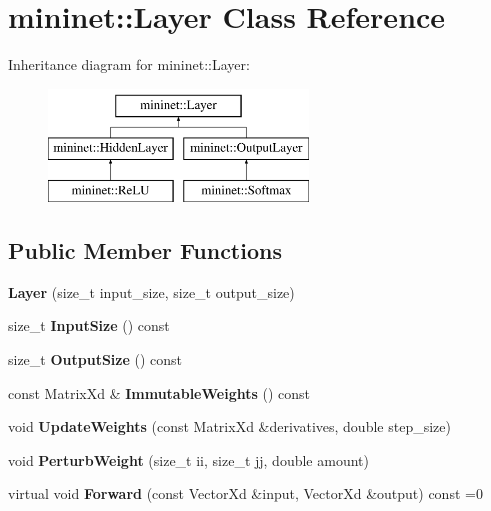 \hypertarget{classmininet_1_1_layer}{}\section{mininet\+:\+:Layer Class Reference}
\label{classmininet_1_1_layer}
Inheritance diagram for mininet\+:\+:Layer\+:\begin{figure}[H]
\begin{center}
\leavevmode
\includegraphics[height=3.000000cm]{classmininet_1_1_layer}
\end{center}
\end{figure}
\subsection*{Public Member Functions}
\begin{DoxyCompactItemize}
\item 
\hypertarget{classmininet_1_1_layer_aed25482510bfaf3ca2fbea9897ddb352}{}\label{classmininet_1_1_layer_aed25482510bfaf3ca2fbea9897ddb352} 
{\bfseries Layer} (size\+\_\+t input\+\_\+size, size\+\_\+t output\+\_\+size)
\item 
\hypertarget{classmininet_1_1_layer_a1e4d5bfdc7e78035d185e4a1a690d53b}{}\label{classmininet_1_1_layer_a1e4d5bfdc7e78035d185e4a1a690d53b} 
size\+\_\+t {\bfseries Input\+Size} () const
\item 
\hypertarget{classmininet_1_1_layer_a57a99b9937ce76a1a6e57903f308aba4}{}\label{classmininet_1_1_layer_a57a99b9937ce76a1a6e57903f308aba4} 
size\+\_\+t {\bfseries Output\+Size} () const
\item 
\hypertarget{classmininet_1_1_layer_a294ed3ba99229b383cf0486a5bbc67bb}{}\label{classmininet_1_1_layer_a294ed3ba99229b383cf0486a5bbc67bb} 
const Matrix\+Xd \& {\bfseries Immutable\+Weights} () const
\item 
\hypertarget{classmininet_1_1_layer_ad00a16de27c913f9a08860c9f623e3cf}{}\label{classmininet_1_1_layer_ad00a16de27c913f9a08860c9f623e3cf} 
void {\bfseries Update\+Weights} (const Matrix\+Xd \&derivatives, double step\+\_\+size)
\item 
\hypertarget{classmininet_1_1_layer_a20738f447572a1fa759decae8913814f}{}\label{classmininet_1_1_layer_a20738f447572a1fa759decae8913814f} 
void {\bfseries Perturb\+Weight} (size\+\_\+t ii, size\+\_\+t jj, double amount)
\item 
\hypertarget{classmininet_1_1_layer_a933df55c92eb813d3e69e9ecfa42dfa6}{}\label{classmininet_1_1_layer_a933df55c92eb813d3e69e9ecfa42dfa6} 
virtual void {\bfseries Forward} (const Vector\+Xd \&input, Vector\+Xd \&output) const =0
\end{DoxyCompactItemize}
